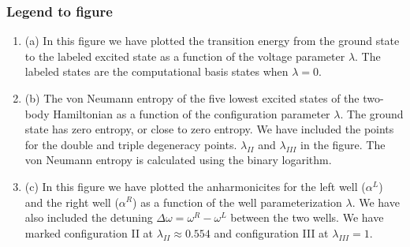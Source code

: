 \documentclass{beamer}
\begin{document}
\begin{frame}
\frametitle{Legend to figure}

\begin{enumerate}
\item (a) In this figure we have plotted the transition energy from the ground state to the labeled excited state as a function of the voltage parameter $\lambda$. The labeled states are the computational basis states when $\lambda = 0$.

\item (b) The von Neumann entropy of the five lowest excited states of the two-body Hamiltonian as a function of the configuration parameter $\lambda$. The ground state has zero entropy, or close to zero entropy. We have included the points for the double and triple degeneracy points. $\lambda_{II}$ and $\lambda_{III}$ in the figure. The von Neumann entropy is calculated using the binary logarithm.

\item (c) In this figure we have plotted the anharmonicites for the left well ($\alpha^L$) and the right well ($\alpha^R$) as a function of the well parameterization $\lambda$. We have also included the detuning $\Delta \omega = \omega^R - \omega^L$ between the two wells. We have marked configuration II at $\lambda_{II} \approx 0.554$ and configuration III at $\lambda_{III} = 1$.
\end{enumerate}

\noindent
\end{frame}
\end{document}
